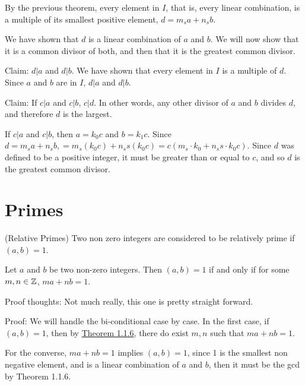 By the previous theorem, every element in \(I\), that is, every linear combination, is a multiple of its smallest positive element, \(d = m_{s}a + n_{s}b\).

We have shown that \(d\) is a linear combination of \(a\) and \(b\). We will now show that it is a common divisor of both, and then that it is the greatest common divisor.

Claim: \(d|a\) and \(d|b\). We have shown that every element in \(I\) is a multiple of \(d\). Since \(a\) and \(b\) are in \(I\), \(d|a\) and \(d|b\).

Claim: If \(c|a\) and \(c|b\), \(c|d\). In other words, any other divisor of \(a\) and \(b\) divides \(d\), and therefore \(d\) is the largest.

If \(c|a\) and \(c|b\), then \(a = k_0c\) and \(b = k_1c\). Since \(d = m_{s}a + n_{s}b, = m_{s}(k_0c) + n_s{s}(k_0c) = c(m_{s}\cdot k_0 + n_s{s} \cdot k_0c)\). Since \(d\) was defined to be a positive integer, it must be greater than or equal to \(c\), and so \(d\) is the greatest common divisor.

\section{Primes}

 (Relative Primes) Two non zero integers are considered to be relatively prime if \((a, b) = 1\).

 Let \(a\) and \(b\) be two non-zero integers. Then \((a, b) = 1\) if and only if for some \(m,n \in \mathbb{Z}\), \(ma + nb = 1\).

Proof thoughts: Not much really, this one is pretty straight forward.

Proof:
We will handle the bi-conditional case by case. In the first case, if \((a, b) = 1\), then by \hyperref[def:1.1.6]{Theorem 1.1.6}, there do exist \(m, n\) such that  \(ma + nb = 1\).

For the converse, \(ma + nb = 1\) implies \((a, b) = 1\), since 1 is the smallest non negative element, and is a linear combination of \(a\) and \(b\), then it must be the gcd by Theorem 1.1.6.

